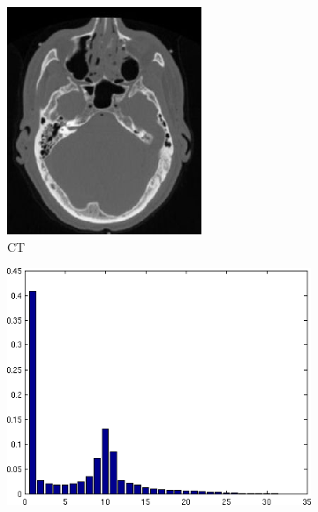 \documentclass[10pt,twoside]{book}
\begin{document}
\begin{figure}
\begin{subfigure}{0.4\textwidth}
     \includegraphics[width=\textwidth]{snapshot_plots__doInterModality_1__doMutualInformation_1__xOffset_0_CT}
     \caption{CT}
     \label{fig:registration_CT}
  \end{subfigure}
  \begin{subfigure}{0.4\textwidth}
     \centering
     \includegraphics[width=\textwidth]{snapshot_plots__doInterModality_1__doMutualInformation_0__xOffset_0__marginal1}

\end{subfigure}
\end{figure}
\end{document}
